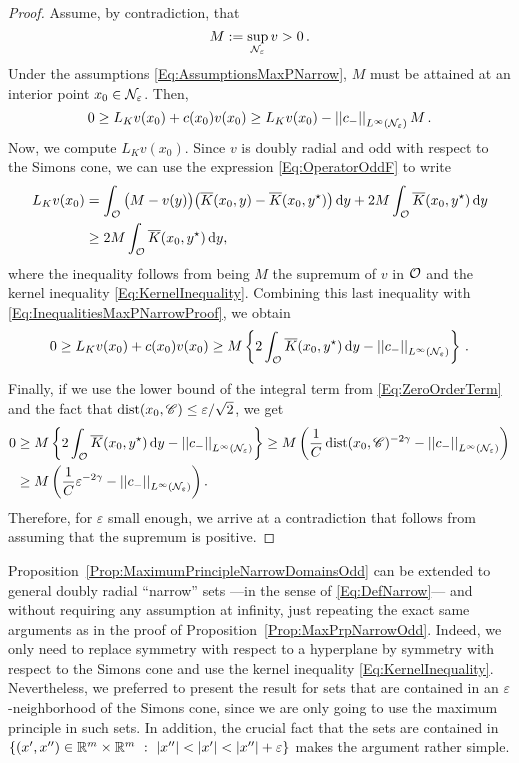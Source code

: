\begin{proof}
	Assume, by contradiction, that
	$$
	M := \sup_{\mathcal{N}_\varepsilon} v > 0\,.
	$$
	Under the assumptions \eqref{Eq:AssumptionsMaxPNarrow}, $M$ must be attained at an interior point $x_0 \in \mathcal{N}_\varepsilon$. Then,
	\begin{equation}
	\label{Eq:InequalitiesMaxPNarrowProof}
	0 \geq L_K  v(x_0) + c(x_0)v(x_0) \geq L_K  v(x_0) - \left | \left |{c_-} \right | \right |_{L^\infty(\mathcal{N}_\varepsilon)}M\,.
	\end{equation} 
	Now, we compute $L_K  v(x_0)$. Since $v$ is doubly radial and odd with respect to the Simons cone, we can use the expression \eqref{Eq:OperatorOddF} to write
	\begin{align*}
	L_K v(x_0) &= \int_{\mathcal{O}} \big (M - v(y) \big) \big (\overline{K}(x_0,y) -\overline{K}(x_0,y^\star)\big) \,\mathrm{d} y + 2M\int_{\mathcal{O}} \overline{K}(x_0,y^\star)\,\mathrm{d} y\\
    &\geq2M \int_{\mathcal{O}} \overline{K}(x_0,y^\star)\,\mathrm{d} y,
	\end{align*}
    where the inequality follows from being $M$ the supremum of $v$ in $\mathcal{O}$ and the kernel inequality \eqref{Eq:KernelInequality}. Combining this last inequality with \eqref{Eq:InequalitiesMaxPNarrowProof}, we obtain
	$$
	0 \geq L_K  v(x_0) + c(x_0)v(x_0)  \geq M \left\{ 2 \int_{\mathcal{O}} \overline{K}(x_0,y^\star)\,\mathrm{d} y - \left | \left |{c_-} \right | \right |_{L^\infty(\mathcal{N}_\varepsilon)}
	\right\}\,.
	$$
	
	Finally, if we use the lower bound of the integral term from \eqref{Eq:ZeroOrderTerm} and the fact that $\operatorname{dist}(x_0,\mathscr{C}) \leq \varepsilon/\sqrt{2}$, we get
	\begin{align*}
	0 &\geq M \left\{ 2 \int_{\mathcal{O}} \overline{K}(x_0,y^\star)\,\mathrm{d} y - \left | \left |{c_-} \right | \right |_{L^\infty(\mathcal{N}_\varepsilon)}
	\right\} \geq M \left(\frac{1}{C}\operatorname{dist}(x_0,\mathscr{C})^{-2\gamma}-\left | \left |{c_-} \right | \right |_{L^\infty(\mathcal{N}_\varepsilon)}\right) \\ &\geq M \left(\frac{1}{C}\varepsilon^{-2\gamma}-\left | \left |{c_-} \right | \right |_{L^\infty(\mathcal{N}_\varepsilon)}\right).
	\end{align*}
	Therefore, for $\varepsilon$ small enough, we arrive at a contradiction that follows from assuming that the supremum is positive.
\end{proof}

\begin{remark}
	Proposition~\ref{Prop:MaximumPrincipleNarrowDomainsOdd} can be extended to general doubly radial ``narrow'' sets ---in the sense of \eqref{Eq:DefNarrow}--- and without requiring any assumption at infinity, just repeating the exact same arguments as in the proof of Proposition~\ref{Prop:MaxPrpNarrowOdd}. Indeed, we only need to replace symmetry with respect to a hyperplane by symmetry with respect to the Simons cone and use the kernel inequality \eqref{Eq:KernelInequality}. Nevertheless, we preferred to present the result for sets that are contained in an $\varepsilon$-neighborhood of the Simons cone, since we are only going to use the maximum principle in such sets. In addition, the crucial fact that the sets are contained in $\{(x',x'')\in \R^m\times\R^m \ : \ |x''|<|x'|<|x''|+ \varepsilon\}$ makes the argument rather simple.
\end{remark}


